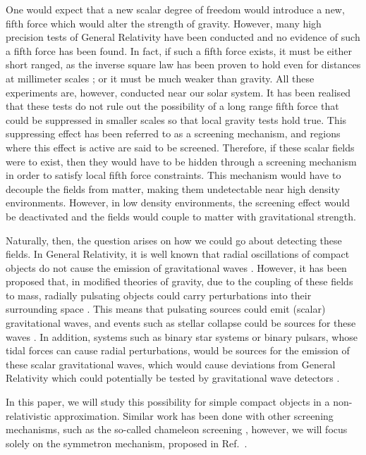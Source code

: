 \documentclass[nofootinbib,twocolumn]{revtex4}
\begin{document}
One would expect that a new scalar degree of freedom would introduce a new, fifth force which would alter the strength of gravity. However, many high precision tests of General Relativity \cite{Will:2014kxa} have been conducted and no evidence of such a fifth force has been found. In fact, if such a fifth force exists, it must be either short ranged, as the inverse square law has been proven to hold even for distances at millimeter scales \cite{Will:2014kxa,Westphal:2020okx}; or it must be much weaker than gravity. All these experiments are, however, conducted near our solar system. It has been realised that these tests do not rule out the possibility of a long range fifth force that could be suppressed in smaller scales so that local gravity tests hold true. This suppressing effect has been referred to as a screening mechanism, and regions where this effect is active are said to be screened. Therefore, if these scalar fields were to exist, then they would have to be hidden through a screening mechanism \cite{Brax:2012gr,Burrage:2017qrf} in order to satisfy local fifth force constraints. This mechanism would have to decouple the fields from matter, making them undetectable near high density environments. However, in low density environments, the screening effect would be deactivated and the fields would couple to matter with gravitational strength.

Naturally, then, the question arises on how we could go about detecting these fields. In General Relativity, it is well known that radial oscillations of compact objects do not cause the emission of gravitational waves \cite{Barausse:2021pwx}. However, it has been proposed that, in modified theories of gravity, due to the coupling of these fields to mass, radially pulsating objects could carry perturbations into their surrounding space \cite{Sotani:2014tua}. This means that pulsating sources could emit (scalar) gravitational waves, and events such as stellar collapse could be sources for these waves \cite{Bezares:2021yek}. In addition, systems such as binary star systems or binary pulsars, whose tidal forces can cause radial perturbations, would be sources for the emission of these scalar gravitational waves, which would cause deviations from General Relativity which could potentially be tested by gravitational wave detectors \cite{Barausse:2021pwx}.

In this paper, we will study this possibility for simple compact objects in a non-relativistic approximation. Similar work has been done with other screening mechanisms, such as the so-called chameleon screening \cite{Khoury:2004,Silvestri:2011ch}, however, we will focus solely on the symmetron mechanism, proposed in Ref.~\cite{Hinterbichler:2010es}. 
\end{document}
